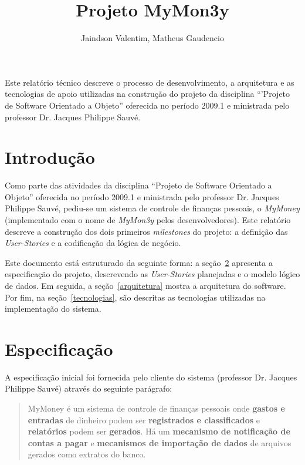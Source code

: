 \documentclass[12pt]{article}
\title{Projeto MyMon3y}
\author{Jaindson Valentim\inst{1}, Matheus Gaudencio\inst{1}}
\begin{document}
 

\maketitle

\begin{resumo}
Este relatório técnico descreve o processo de desenvolvimento, a arquitetura e as tecnologias de apoio utilizadas na construção do projeto da disciplina ``'Projeto de Software Orientado a Objeto'' oferecida no período 2009.1 e ministrada pelo professor Dr. Jacques Philippe Sauvé.
\end{resumo}

\section{Introdução}
\label{intro}

Como parte das atividades da disciplina ``Projeto de Software Orientado a Objeto'' oferecida no período 2009.1 e ministrada pelo professor Dr. Jacques Philippe Sauvé, pediu-se um sistema de controle de finanças pessoais, o \textit{MyMoney} (implementado com o nome de \textit{MyMon3y} pelos desenvolvedores). Este relatório descreve a construção dos dois primeiros \textit{milestones} do projeto: a definição das \textit{User-Stories} e a codificação da lógica de negócio.

Este documento está estruturado da seguinte forma: a seção~\ref{especificacao} apresenta a especificação do projeto, descrevendo as \textit{User-Stories} planejadas e o modelo lógico de dados. Em seguida, a seção~\ref{arquitetura} mostra a arquitetura do software. Por fim, na seção~\ref{tecnologias}, são descritas as tecnologias utilizadas na implementação do sistema.

\section{Especificação}
\label{especificacao}

A especificação inicial foi fornecida pelo cliente do sistema (professor Dr. Jacques Philippe Sauvé) através do seguinte parágrafo:

\begin{quote}
MyMoney é um sistema de controle de finanças pessoais onde \textbf{gastos e entradas} de dinheiro podem ser \textbf{registrados e classificados} e \textbf{relatórios} podem ser \textbf{gerados}. Há um \textbf{mecanismo de notificação de contas a pagar} e \textbf{mecanismos de importação de dados} de arquivos gerados como extratos do banco.
\end{quote}
\end{document}
